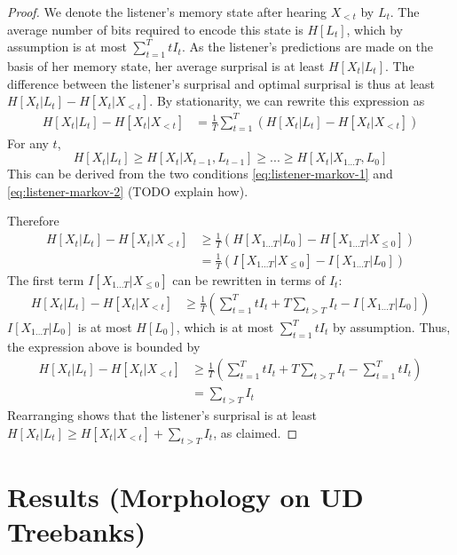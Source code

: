 \documentclass[11pt,letterpaper]{article}
\begin{document}
\begin{proof}
We denote the listener's memory state after hearing $X_{<t}$ by $L_t$.
The average number of bits required to encode this state is $H[L_t]$, which by assumption is at most $\sum_{t=1}^T t I_t$.
As the listener's predictions are made on the basis of her memory state, her average surprisal is at least $H[X_t | L_t]$.
The difference between the listener's surprisal and optimal surprisal is thus at least $H[X_t | L_t] - H[X_t | X_{<t}]$.
By stationarity, we can rewrite this expression as
\begin{align*}
	H[X_t | L_t] - H[X_t | X_{<t}] &=  \frac{1}{T} \sum_{t=1}^{T} \left(H[X_t | L_t] - H[X_t | X_{<t}]\right) 
\end{align*}
For any $t$,
	$$H[X_t | L_t] \geq H[X_t| X_{t-1}, L_{t-1}] \geq ... \geq H[X_t|X_{1 \dots T}, L_0]$$
	This can be derived from the two conditions \ref{eq:listener-markov-1} and \ref{eq:listener-markov-2} (TODO explain how).

Therefore
\begin{align*}
	H[X_t | L_t] - H[X_t | X_{<t}]& \geq   \frac{1}{T} \left(H[X_{1\dots T} | L_0] - H[X_{1\dots T} | X_{\leq 0}]\right)  \\
	& = \frac{1}{T} \left(I[X_{1\dots T}|X_{\leq 0}] - I[X_{1\dots T}|L_0]\right) 
\end{align*}
	The first term $I[X_{1\dots T}|X_{\leq 0}]$ can be rewritten in terms of $I_t$:
\begin{align*}
	H[X_t | L_t] - H[X_t | X_{<t}]& \geq \frac{1}{T} \left(\sum_{t=1}^T t I_t + T \sum_{t > T} I_t - I[X_{1\dots T}|L_0]\right) 
\end{align*}
	$I[X_{1\dots T}|L_0]$ is at most $H[L_0]$, which is at most $\sum_{t=1}^T t I_t$ by assumption. Thus, the expression above is bounded by
	\begin{align*}
	H[X_t | L_t] - H[X_t | X_{<t}]& \geq \frac{1}{T} \left(\sum_{t=1}^T t I_t + T \sum_{t > T} I_t - \sum_{t=1}^T t I_t\right) \\
		&= \sum_{t > T} I_t
\end{align*}
	Rearranging shows that the listener's surprisal is at least $H[X_t|L_t] \geq H[X_t | X_{<t}] + \sum_{t > T} I_t$, as claimed.
\end{proof}




\section{Results (Morphology on UD Treebanks)}\label{sec:results-table}
\end{document}

